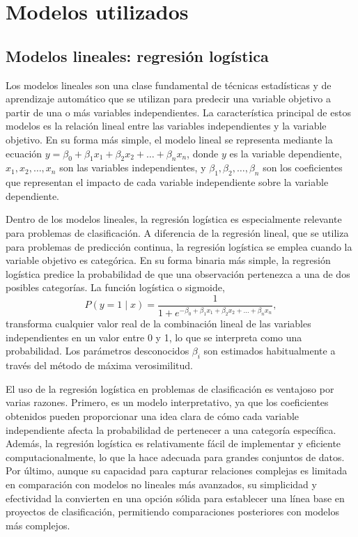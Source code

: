 
\section{Modelos utilizados}
\label{sec:models}

\subsection{Modelos lineales: regresión logística}
\label{subsec:model-linear}

Los modelos lineales son una clase fundamental de técnicas estadísticas y de aprendizaje automático que se utilizan para predecir una variable objetivo a partir de una o más variables independientes. La característica principal de estos modelos es la relación lineal entre las variables independientes y la variable objetivo. En su forma más simple, el modelo lineal se representa mediante la ecuación $y = \beta_0 + \beta_1 x_1 + \beta_2 x_2 + \dots + \beta_n x_n$, donde $y$ es la variable dependiente, $x_1, x_2, \dots, x_n$ son las variables independientes, y $\beta_1, \beta_2, \dots, \beta_n$ son los coeficientes que representan el impacto de cada variable independiente sobre la variable dependiente.

Dentro de los modelos lineales, la regresión logística es especialmente relevante para problemas de clasificación. A diferencia de la regresión lineal, que se utiliza para problemas de predicción continua, la regresión logística se emplea cuando la variable objetivo es categórica. En su forma binaria más simple, la regresión logística predice la probabilidad de que una observación pertenezca a una de dos posibles categorías. La función logística o sigmoide, 
\begin{equation*}
    P(y=1\mid x) = \frac{1}{1+e^{-\beta_0 + \beta_1 x_1 + \beta_2 x_2 + \dots + \beta_n x_n}},
\end{equation*}
transforma cualquier valor real de la combinación lineal de las variables independientes en un valor entre 0 y 1, lo que se interpreta como una probabilidad. Los parámetros desconocidos $\beta_i$ son estimados habitualmente a través del método de máxima verosimilitud.

El uso de la regresión logística en problemas de clasificación es ventajoso por varias razones. Primero, es un modelo interpretativo, ya que los coeficientes obtenidos pueden proporcionar una idea clara de cómo cada variable independiente afecta la probabilidad de pertenecer a una categoría específica. Además, la regresión logística es relativamente fácil de implementar y eficiente computacionalmente, lo que la hace adecuada para grandes conjuntos de datos. Por último, aunque su capacidad para capturar relaciones complejas es limitada en comparación con modelos no lineales más avanzados, su simplicidad y efectividad la convierten en una opción sólida para establecer una línea base en proyectos de clasificación, permitiendo comparaciones posteriores con modelos más complejos.

